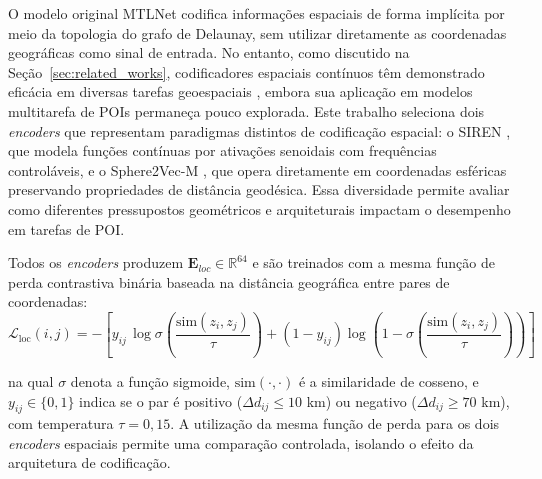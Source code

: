 O modelo original MTLNet codifica informações espaciais de forma implícita por meio da topologia do grafo de Delaunay, sem utilizar diretamente as coordenadas geográficas como sinal de entrada. No entanto, como discutido na Seção~\ref{sec:related_works}, codificadores espaciais contínuos têm demonstrado eficácia em diversas tarefas geoespaciais \cite{wu2024torchspatial}, embora sua aplicação em modelos multitarefa de POIs permaneça pouco explorada. Este trabalho seleciona dois \textit{encoders} que representam paradigmas distintos de codificação espacial: o SIREN \cite{rußwurm2024geographiclocationencodingspherical}, que modela funções contínuas por ativações senoidais com frequências controláveis, e o Sphere2Vec-M \cite{mai2023sphere2vecgeneralpurposelocationrepresentation}, que opera diretamente em coordenadas esféricas preservando propriedades de distância geodésica. Essa diversidade permite avaliar como diferentes pressupostos geométricos e arquiteturais impactam o desempenho em tarefas de POI.

Todos os \textit{encoders} produzem $\mathbf{E}_{loc} \in \mathbb{R}^{64}$ e são 
treinados com a mesma função de perda contrastiva binária baseada na distância geográfica entre pares de coordenadas:
\begin{equation}
\mathcal{L}_{\text{loc}}(i,j)
=
- \left[
y_{ij}\,\log \sigma\!\left(\frac{\text{sim}(z_i,z_j)}{\tau}\right)
+
(1-y_{ij})
\log \left(1 - \sigma\!\left(\frac{\text{sim}(z_i,z_j)}{\tau}\right)\right)
\right]
\end{equation}

na qual $\sigma$ denota a função sigmoide, $\text{sim}(\cdot,\cdot)$ é a similaridade de cosseno, e $y_{ij} \in \{0,1\}$ indica se o par é positivo ($\Delta d_{ij} \leq 10$ km) ou negativo ($\Delta d_{ij} \geq 70$ km), com temperatura $\tau = 0{,}15$. A utilização da mesma função de perda para os dois \textit{encoders} espaciais permite uma comparação controlada, isolando o efeito da arquitetura de codificação.



